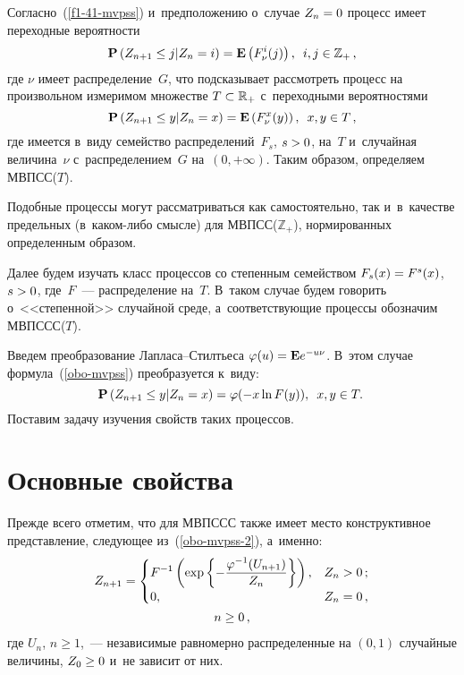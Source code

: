 \begin{multicols}{2}
Согласно~(\ref{f1-41-mvpss}) и~предположению о~случае $Z_n\hm=0$ процесс
имеет переходные вероятности
$$
{\bf P}\left(Z_{n+1}\le j|Z_n=i\right)={\bf E}
\left(F^i_\nu(j)\right),\enskip i,j\in \mathbb{Z}_+\,,
$$
где $\nu$ имеет распределение~$G$, что подсказывает 
рас\-смот\-реть процесс на произвольном измеримом
множестве $T\hm\subset \mathbb{R}_+$ с~переходными вероятностями
\begin{equation}
\label{obo-mvpss}
{\bf P}\left(Z_{n+1}\le y|Z_n=x\right)={\bf  E}\left(F^x_\nu(y)\right),\enskip x,y\in T\,,
\end{equation}
где имеется в~виду семейство распределений~$F_s$, $s\hm>0$, на~$T$ 
и~случайная величина~$\nu$ с~распределением~$G$ на~$(0,+\infty)$. 
Таким образом, определяем МВПСС($T$).

Подобные процессы могут рас\-смат\-ри\-вать\-ся как самостоятельно,
так и~в~качестве предельных (в~ка\-ком-ли\-бо смысле) для
МВПСС($\mathbb{Z}_+$), нормированных определенным образом.

Далее будем изучать класс процессов со степенным семейством $F_s(x)\hm=F^s(x)$, $s\hm>0$,
где~$F$~--- распределение на~$T$. В~таком случае будем говорить 
о~<<степенной>> случайной среде,
а~со\-от\-вет\-ст\-ву\-ющие процессы обозначим МВПССС($T$).

Введем преобразование Лап\-ла\-са--Стилть\-еса 
$\varphi(u)\hm={\bf E}e^{-u\nu}$. В~этом случае формула~(\ref{obo-mvpss}) 
преобразуется к~виду:
\begin{equation}
\hspace*{-2mm}
\label{obo-mvpss-2}
{\bf P}\left(Z_{n+1}\le y|Z_n=x\right)=\varphi(-x\ln F(y)),\enskip x,y\in T.\!\!
\end{equation}
Поставим задачу изуче\-ния свойств таких процессов.

\section{Основные свойства}

Прежде всего отметим, что для МВПССС так\-же имеет мес\-то конструктивное
пред\-став\-ле\-ние, сле\-ду\-ющее из~(\ref{obo-mvpss-2}), а~именно:
\begin{multline}
\label{obo2-mvpss}
Z_{n+1}=\begin{cases}
\displaystyle
F^{-1}\left(\exp\left\{-\displaystyle\frac{\displaystyle \varphi^{-1}(U_{n+1})\mathstrut}{\displaystyle Z_n\mathstrut}\right\}\right),& Z_n>0\,;\\
\displaystyle
0,& Z_n=0\,,\end{cases}\\ n\ge 0\,,
\end{multline}
где $U_n$, $n\ge 1$,~--- независимые равномерно распределенные на $(0,1)$ 
случайные величины,
$Z_0\hm\ge 0$ и~не зависит от них.


\end{multicols}

